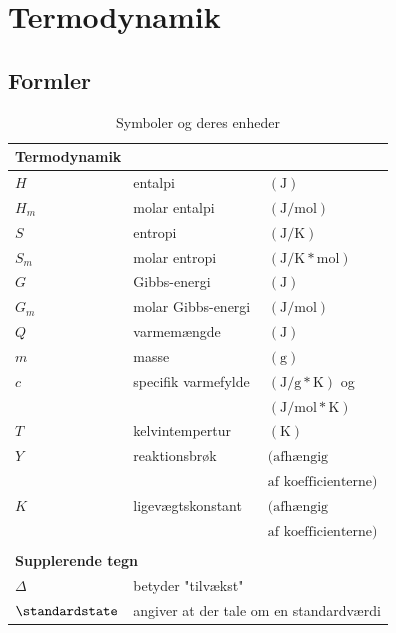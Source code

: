 \documentclass[a4paper, 11pt, twocolumn]{report}
\begin{document}
\chapter{Termodynamik}
\section{Formler}

\begin{table}[H]
    \begin{tabular}{ l l l}
    \multicolumn{3}{l}{\textbf{Termodynamik}} \\
        \hline  
        $H$ & entalpi & $(\text{J})$ \\
        $H_m$ & molar entalpi & $(\text{J}/\text{mol})$ \\
        $S$ & entropi & $(\text{J}/\text{K})$ \\
        $S_m$ & molar entropi & $(\text{J}/\text{K}*\text{mol})$ \\
        $G$ & Gibbs-energi & $(\text{J})$ \\
        $G_m$ & molar Gibbs-energi & $(\text{J}/\text{mol})$ \\
        $Q$ & varmemængde & $(\text{J})$ \\
        $m$ & masse & $(\text{g})$ \\
        $c$ & specifik varmefylde & $(\text{J}/\text{g}*\text{K})$ og \\ 
        $ $ & $ $ & $(\text{J}/\text{mol}*\text{K})$ \\
        $T$ & kelvintempertur & $(\text{K})$ \\
        $Y$ & reaktionsbrøk & $(\text{afhængig}$ \\ 
        $ $ & $ $ & $\text{af koefficienterne})$ \\
        $K$ & ligevægtskonstant & $(\text{afhængig}$ \\ 
        $ $ & $ $ & $\text{af koefficienterne})$ \\\\

        \multicolumn{3}{l}{\textbf{Supplerende tegn}} \\
        \hline
        $\Delta$ & betyder "tilvækst" \\
        \multicolumn{1}{l}{$\standardstate$} & \multicolumn{2}{l}{angiver at der tale om en standardværdi}
        
    \end{tabular}
    \caption{Symboler og deres enheder}
    \label{tab:termodynamik_table}
\end{table}
\end{document}
